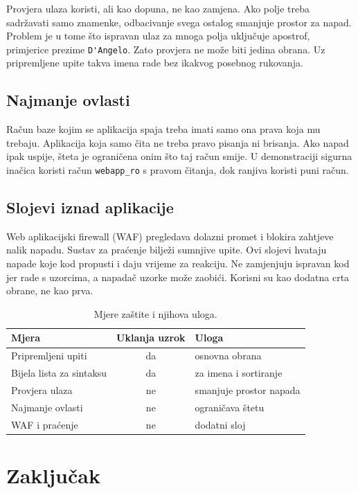 \documentclass{mathos}
\begin{document}
Provjera ulaza koristi, ali kao dopuna, ne kao zamjena. Ako polje treba sadržavati samo znamenke, odbacivanje svega ostalog smanjuje prostor za napad. Problem je u tome što ispravan ulaz za mnoga polja uključuje apostrof, primjerice prezime \verb|D'Angelo|. Zato provjera ne može biti jedina obrana. Uz pripremljene upite takva imena rade bez ikakvog posebnog rukovanja.

\section{Najmanje ovlasti}

Račun baze kojim se aplikacija spaja treba imati samo ona prava koja mu trebaju. Aplikacija koja samo čita ne treba pravo pisanja ni brisanja. Ako napad ipak uspije, šteta je ograničena onim što taj račun smije. U demonstraciji sigurna inačica koristi račun \verb|webapp_ro| s pravom čitanja, dok ranjiva koristi puni račun.

\section{Slojevi iznad aplikacije}

Web aplikacijski firewall (WAF) pregledava dolazni promet i blokira zahtjeve nalik napadu. Sustav za praćenje bilježi sumnjive upite. Ovi slojevi hvataju napade koje kod propusti i daju vrijeme za reakciju. Ne zamjenjuju ispravan kod jer rade s uzorcima, a napadač uzorke može zaobići. Korisni su kao dodatna crta obrane, ne kao prva.

\begin{table}[hbtp]
\centering
\begin{tabular}{|l|c|l|}\hline
Mjera & Uklanja uzrok & Uloga \\\hline
Pripremljeni upiti & da & osnovna obrana \\\hline
Bijela lista za sintaksu & da & za imena i sortiranje \\\hline
Provjera ulaza & ne & smanjuje prostor napada \\\hline
Najmanje ovlasti & ne & ograničava štetu \\\hline
WAF i praćenje & ne & dodatni sloj \\\hline
\end{tabular}
\caption{Mjere zaštite i njihova uloga.}
\label{tab:mjere}
\end{table}


\chapter{Zaključak}\label{zakljucak}
\end{document}
